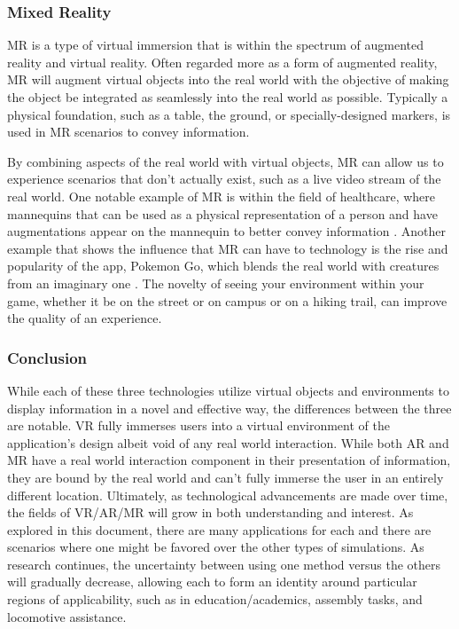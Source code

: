 \documentclass[onecolumn, draftclsnofoot,10pt, compsoc]{IEEEtran}
\begin{document}
\subsubsection{Mixed Reality}
    MR is a type of virtual immersion that is within the spectrum of augmented reality and virtual reality. Often regarded more as a form of augmented reality, MR will augment virtual objects into the real world with the objective of making the object be integrated as seamlessly into the real world as possible. Typically a physical foundation, such as a table, the ground, or specially-designed markers, is used in MR scenarios to convey information. 
    
    By combining aspects of the real world with virtual objects, MR can allow us to experience scenarios that don't actually exist, such as a live video stream of the real world. One notable example of MR is within the field of healthcare, where mannequins that can be used as a physical representation of a person and have augmentations appear on the mannequin to better convey information \cite{2}. Another example that shows the influence that MR can have to technology is the rise and popularity of the app, Pokemon Go, which blends the real world with creatures from an imaginary one \cite{2}. The novelty of seeing your environment within your game, whether it be on the street or on campus or on a hiking trail, can improve the quality of an experience. 

\subsubsection{Conclusion}
    While each of these three technologies utilize virtual objects and environments to display information in a novel and effective way, the differences between the three are notable. VR fully immerses users into a virtual environment of the application's design albeit void of any real world interaction. While both AR and MR have a real world interaction component in their presentation of information, they are bound by the real world and can't fully immerse the user in an entirely different location. 
    Ultimately, as technological advancements are made over time, the fields of VR/AR/MR will grow in both understanding and interest. As explored in this document, there are many applications for each and there are scenarios where one might be favored over the other types of simulations. As research continues, the uncertainty between using one method versus the others will gradually decrease, allowing each to form an identity around particular regions of applicability, such as in education/academics, assembly tasks, and locomotive assistance. 
    
\end{document}
